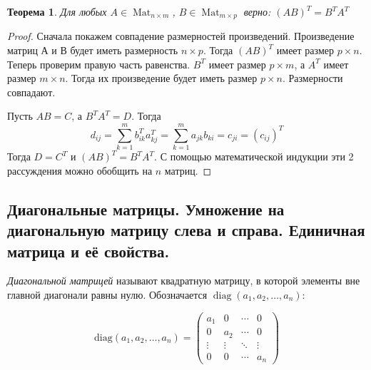 \documentclass[a4paper, 12pt]{article}
\DeclareMathOperator{\Mat}{Mat}
\DeclareMathOperator{\diag}{diag}
\newtheorem*{T_multiplication}{Теорема}
\begin{document}
\begin{T_multiplication}
Для любых $A \in \Mat_{n \times m}$, $B \in \Mat_{m \times p}$ верно:
$(AB)^T = B^T A^T$
\end{T_multiplication}
\begin{proof}
Сначала покажем совпадение размерностей произведений. Произведение матриц А и В будет иметь размерность $n \times p$. Тогда $(AB)^T$ имеет размер $p \times n$. Теперь проверим правую часть равенства. $B^T$ имеет размер $p \times m$, а $A^T$ имеет размер $m \times n$. Тогда их произведение будет иметь размер $p \times n$. Размерности совпадают.

Пусть $AB = C$, а $B^T A^T = D$. Тогда
\[d_{ij} = \sum_{k = 1}^{m} b_{ik}^Ta_{kj}^T = \sum_{k = 1}^{m} a_{jk}b_{ki} = c_{ji} = (c_{ij})^T\]
Тогда $D = C^T$ и $(AB)^T = B^T A^T$. С помощью математической индукции эти 2 рассуждения можно обобщить на $n$ матриц.
\end{proof}

\subsection{Диагональные матрицы. Умножение на диагональную матрицу слева и справа. Единичная матрица и её свойства.}

\textit{Диагональной матрицей} называют квадратную матрицу, в которой элементы вне главной диагонали равны нулю. Обозначается $\diag(a_1, a_2, \ldots, a_n)$:

\[\mathrm{diag}(a_1, a_2, \ldots, a_n) = \begin{pmatrix}
a_1 & 0 & \cdots & 0 \\
0 & a_2 & \cdots & 0 \\         
\vdots & \vdots & \ddots & \vdots \\
0 & 0 & \cdots  & a_n
\end{pmatrix}\]
\end{document}
